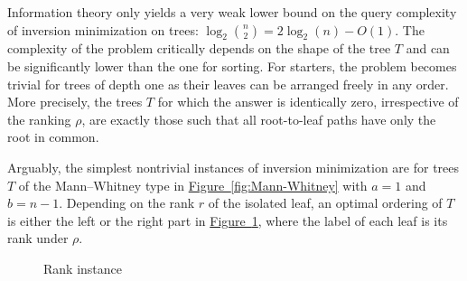 \documentclass[11pt]{article}
\numberwithin{equation}{section}
\theoremstyle{definition}
\theoremstyle{plain}
\newcommand{\expref}[2]{\hyperref[#2]{#1~\ref{#2}}}
\newcommand{\ranking}{\rho}
\begin{document}
Information theory only yields a very weak lower bound on the query complexity of inversion minimization on trees: $\log_2 \binom{n}{2} = 2 \log_2(n) - O(1)$. The complexity of the problem critically depends on the shape of the tree $T$ and can be significantly lower than the one for sorting. For starters, the problem becomes trivial for trees of depth one as their leaves can be arranged freely in any order. More precisely, the trees $T$ for which the answer is identically zero, irrespective of the ranking $\ranking$, are exactly those such that all root-to-leaf paths have only the root in common. 

Arguably, the simplest nontrivial instances of inversion minimization are for trees $T$ of the Mann--Whitney type in \expref{Figure}{fig:Mann-Whitney} with $a=1$ and $b=n-1$. Depending on the rank $r$ of the isolated leaf, an optimal ordering of $T$ is either the left or the right part in \expref{Figure}{fig:simplest-non-trivial}, where the label of each leaf is its rank under $\ranking$.

\begin{figure}[ht]
\centering
    \hspace{0.75in}
\caption{Rank instance}\label{fig:simplest-non-trivial}
\end{figure}
\end{document}
